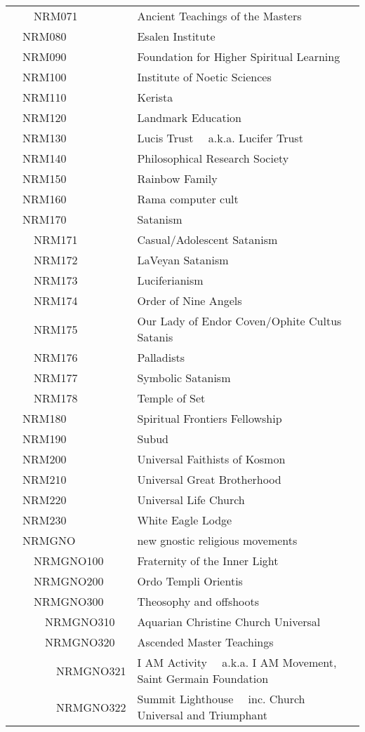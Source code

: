 \documentclass[12pt]{article}
\begin{document}
\begin{tiny}
\begin{center}
\begin{longtable}{|l|l|}
~~~~NRM071 & Ancient Teachings of the Masters \\
~~NRM080 & Esalen Institute \\
~~NRM090 & Foundation for Higher Spiritual Learning \\
~~NRM100 & Institute of Noetic Sciences \\
~~NRM110 & Kerista \\
~~NRM120 & Landmark Education \\
~~NRM130 & Lucis Trust	~~a.k.a. Lucifer Trust \\
~~NRM140 & Philosophical Research Society \\
~~NRM150 & Rainbow Family \\
~~NRM160 & Rama computer cult \\
~~NRM170 & Satanism \\
~~~~NRM171 & Casual/Adolescent Satanism \\
~~~~NRM172 & LaVeyan Satanism \\
~~~~NRM173 & Luciferianism \\
~~~~NRM174 & Order of Nine Angels \\
~~~~NRM175 & Our Lady of Endor Coven/Ophite Cultus Satanis \\
~~~~NRM176 & Palladists \\
~~~~NRM177 & Symbolic Satanism \\
~~~~NRM178 & Temple of Set \\
~~NRM180 & Spiritual Frontiers Fellowship \\
~~NRM190 & Subud \\
~~NRM200 & Universal Faithists of Kosmon \\
~~NRM210 & Universal Great Brotherhood \\
~~NRM220 & Universal Life Church \\
~~NRM230 & White Eagle Lodge \\
~~NRMGNO & new gnostic religious movements \\
~~~~NRMGNO100 & Fraternity of the Inner Light \\
~~~~NRMGNO200 & Ordo Templi Orientis \\
~~~~NRMGNO300 & Theosophy and offshoots \\
~~~~~~NRMGNO310 & Aquarian Christine Church Universal \\
~~~~~~NRMGNO320 & Ascended Master Teachings \\
~~~~~~~~NRMGNO321 & I AM Activity	~~a.k.a. I AM Movement, Saint Germain Foundation \\
~~~~~~~~NRMGNO322 & Summit Lighthouse	~~inc. Church Universal and Triumphant \\

\end{longtable}
\end{center}
\end{tiny}
\end{document}
